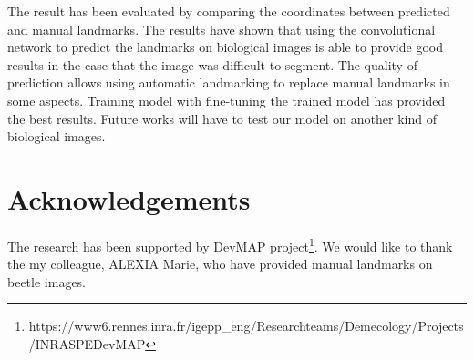 \documentclass[10pt]{article}
\begin{document}
The result has been evaluated by comparing the coordinates between predicted and manual landmarks.  The results have shown that using the convolutional network to predict the landmarks on biological images is able to provide good results in the case that the image was difficult to segment. The quality of prediction allows using automatic landmarking to replace manual landmarks in some aspects. 
Training model with fine-tuning the trained model has provided the best results. Future works will have to test our model on another kind of biological images.

\section*{Acknowledgements}
The research has been supported by DevMAP project\footnote{https://www6.rennes.inra.fr/igepp\_eng/Research\-teams/Demecology/Projects/INRA\-SPE\-DevMAP}. We would like to thank the my colleague, ALEXIA Marie, who have provided manual landmarks on beetle images.


\end{document}
